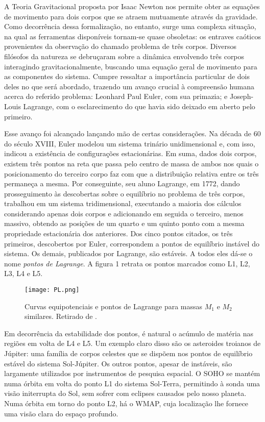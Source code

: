 A Teoria Gravitacional proposta por Isaac Newton nos permite obter as equações de movimento para dois corpos que se atraem mutuamente através da gravidade. Como decorrência dessa formalização, no entanto, surge uma complexa situação, na qual as ferramentas disponíveis tornam-se quase obsoletas: os entraves caóticos provenientes da observação do chamado problema de três corpos. Diversos filósofos da natureza se debruçaram sobre a dinâmica envolvendo três corpos interagindo gravitacionalmente, buscando uma equação geral de movimento para as componentes do sistema. Cumpre ressaltar a importância particular de dois deles no que será abordado, trazendo um avanço crucial à compreensão humana acerca do referido problema: Leonhard Paul Euler, com sua primazia; e Joseph-Louis Lagrange, com o esclarecimento do que havia sido deixado em aberto pelo primeiro.

Esse avanço foi alcançado lançando mão de certas considerações. Na década de 60 do século XVIII, Euler modelou um sistema trinário unidimensional\cite{eultc} e, com isso, indicou a existência de configurações estacionárias. Em suma, dados dois corpos, existem três pontos na reta que passa pelo centro de massa de ambos nos quais o posicionamento do terceiro corpo faz com que a distribuição relativa entre os três permaneça a mesma. Por conseguinte, seu aluno Lagrange, em 1772, dando prosseguimento às descobertas sobre o equilíbrio no problema de três corpos, trabalhou em um sistema tridimensional, executando a maioria dos cálculos considerando apenas dois corpos e adicionando em seguida o terceiro, menos massivo\cite{lagtc}, obtendo as posições de um quarto e um quinto ponto com a mesma propriedade estacionária dos anteriores. Dos cinco pontos citados, os três primeiros, descobertos por Euler, correspondem a pontos de equilíbrio instável do sistema. Os demais, publicados por Lagrange, são estáveis. A todos eles dá-se o nome \textit{pontos de Lagrange}. A figura 1 retrata os pontos marcados como L1, L2, L3, L4 e L5.

\begin{figure}[!h]
\centering
\texttt{[image: PL.png]}
\caption{Curvas equipotenciais e pontos de Lagrange para massas $M_1$ e $M_2$ similares. Retirado de \cite[figura 23.68, p. 526]{ksouza}.}
\end{figure}
   
Em decorrência da estabilidade dos pontos, é natural o acúmulo de matéria nas regiões em volta de L4 e L5. Um exemplo claro disso são os asteroides troianos de Júpiter: uma família de corpos celestes que se dispõem nos pontos de equilíbrio estável do sistema Sol-Júpiter. Os outros pontos, apesar de instáveis, são largamente utilizados por instrumentos de pesquisa espacial. O SOHO\cite{soho} se mantém numa órbita em volta do ponto L1 do sistema Sol-Terra, permitindo à sonda uma visão initerrupta do Sol, sem sofrer com eclipses causados pelo nosso planeta. Numa órbita em torno do ponto L2, há o WMAP\cite{wmap}, cuja localização lhe fornece uma visão clara do espaço profundo.



